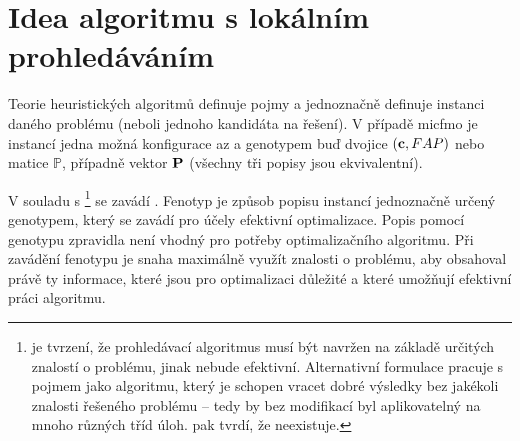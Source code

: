 
\section{Idea algoritmu s lokálním prohledáváním}
Teorie heuristických algoritmů definuje pojmy  a  
 jednoznačně definuje instanci daného problému (neboli jednoho 
kandidáta na řešení). V případě \ac{micfmo} je instancí jedna možná konfigurace \ac{az} a genotypem buď dvojice $(\mathbf{c}, FAP)$ nebo matice $\mathbb{P}$, 
případně vektor $\mathbf{P}$ (všechny tři popisy jsou ekvivalentní). 

V souladu s \footnote{ je tvrzení, že prohledávací algoritmus musí být navržen na základě 
určitých znalostí o problému, jinak nebude efektivní. Alternativní formulace pracuje s pojmem  jako algoritmu, který 
je schopen vracet dobré výsledky bez jakékoli znalosti řešeného problému -- tedy by bez modifikací byl aplikovatelný na mnoho různých tříd úloh. 
 pak tvrdí, že  neexistuje.} se zavádí . Fenotyp je způsob popisu instancí jednoznačně 
určený genotypem, který se zavádí pro účely efektivní optimalizace. Popis pomocí genotypu zpravidla není vhodný pro potřeby optimalizačního algoritmu. 
Při zavádění fenotypu je snaha maximálně využít znalosti o problému, aby obsahoval právě ty informace, které jsou pro optimalizaci důležité a které 
umožňují efektivní práci algoritmu.

